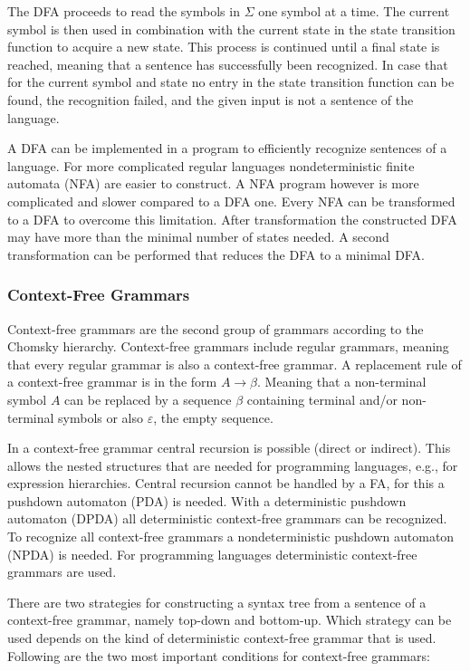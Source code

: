 The DFA proceeds to read the symbols in $\Sigma$ one symbol at a time. The current symbol is then used in combination with the current state in the state transition function to acquire a new state. This process is continued until a final state is reached, meaning that a sentence has successfully been recognized. In case that for the current symbol and state no entry in the state transition function can be found, the recognition failed, and the given input is not a sentence of the language. 

A DFA can be implemented in a program to efficiently recognize sentences of a language. For more complicated regular languages nondeterministic finite automata (NFA) are easier to construct. A NFA program however is more complicated and slower compared to a DFA one. Every NFA can be transformed to a DFA to overcome this limitation. After transformation the constructed DFA may have more than the minimal number of states needed. A second transformation can be performed that reduces the DFA to a minimal DFA. 

\subsubsection{Context-Free Grammars}

Context-free grammars are the second group of grammars according to the Chomsky hierarchy. Context-free grammars include regular grammars, meaning that every regular grammar is also a context-free grammar. A replacement rule of a context-free grammar is in the form $A \rightarrow \beta$. Meaning that a non-terminal symbol $A$ can be replaced by a sequence $\beta$ containing terminal and/or non-terminal symbols or also $\varepsilon$, the empty sequence. 

In a context-free grammar central recursion is possible (direct or indirect). This allows the nested structures that are needed for programming languages, e.g., for expression hierarchies. Central recursion cannot be handled by a FA, for this a pushdown automaton (PDA) is needed. With a deterministic pushdown automaton (DPDA) all deterministic context-free grammars can be recognized. To recognize all context-free grammars a nondeterministic pushdown automaton (NPDA) is needed. For programming languages deterministic context-free grammars are used. 

There are two strategies for constructing a syntax tree from a sentence of a context-free grammar, namely top-down and bottom-up. Which strategy can be used depends on the kind of deterministic context-free grammar that is used. Following are the two most important conditions for context-free grammars:

